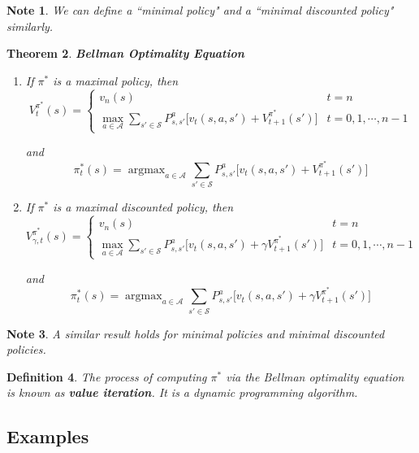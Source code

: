 \documentclass[12pt]{amsart}
\newtheorem{thm}{Theorem}[section]
\newtheorem{defn}[thm]{Definition}
\newtheorem{note}[thm]{Note}
\newcommand{\gam}{\gamma}
\newcommand{\MA}{\mathcal{A}}
\newcommand{\MS}{\mathcal{S}}
\DeclareMathOperator*{\argmax}{argmax}
\begin{document}
\begin{note}
We can define a ``minimal policy" and a ``minimal discounted policy" similarly.
\end{note}
\newpage

\begin{thm}{\textbf{Bellman Optimality Equation}} 
\begin{enumerate}
\item If $\pi^*$ is a maximal policy, then 
\[ V_t^{\pi^*}(s) =
\begin{cases}
 v_n(s) & t = n \\
 \max\limits_{a \in \MA} \sum\limits_{s' \in \MS}P^{a}_{s, s'} \bigg[v_t(s,a, s') + V_{t+1}^{\pi^*}(s')\bigg] & t= 0, 1, \cdots, n-1
\end{cases}
\]

and $$\pi^*_t(s) = \argmax_{a \in \MA} \sum\limits_{s' \in \MS}P^{a}_{s, s'} \bigg[v_t(s, a, s') +  V_{t+1}^{\pi^*}(s')\bigg]$$ 

\item If $\pi^*$ is a maximal discounted policy, then 
\[ V_{\gam, t}^{\pi^*}(s) =
\begin{cases}
 v_n(s) & t = n \\
 \max\limits_{a \in \MA} \sum\limits_{s' \in \MS}P^{a}_{s, s'} \bigg[v_t(s,a, s') + \gam V_{t+1}^{\pi^*}(s')\bigg] & t= 0, 1, \cdots, n-1
\end{cases}
\]

and $$\pi^*_t(s) = \argmax_{a \in \MA} \sum\limits_{s' \in \MS}P^{a}_{s, s'} \bigg[v_t(s, a, s') +  \gam V_{t+1}^{\pi^*}(s')\bigg]$$ 
\end{enumerate}
\end{thm}

\begin{note}
A similar result holds for minimal policies and minimal discounted policies.
\end{note}

\begin{defn}
The process of computing $\pi^*$ via the Bellman optimality equation is known as \textbf{value iteration}. It is a dynamic programming algorithm. 
\end{defn}

\subsection{Examples}
\end{document}
